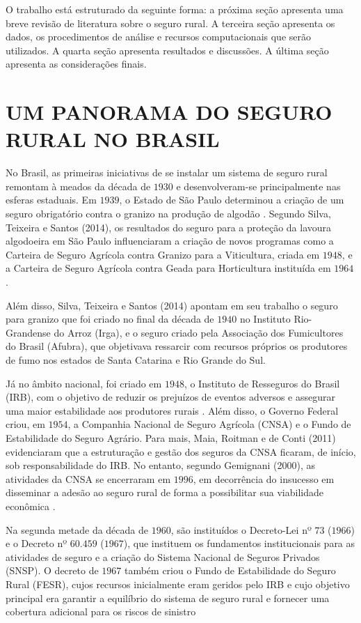O trabalho está estruturado da seguinte forma: a próxima seção apresenta uma breve revisão de literatura sobre o seguro rural. A terceira seção apresenta os dados, os procedimentos de análise e recursos computacionais que serão utilizados. A quarta seção apresenta resultados e discussões. A última seção apresenta as considerações finais.

\section{UM PANORAMA DO SEGURO RURAL NO BRASIL}

No Brasil, as primeiras iniciativas de se instalar um sistema de seguro rural remontam à meados da década de $1930$ e desenvolveram-se principalmente nas esferas estaduais. Em $1939$, o Estado de São Paulo determinou a criação de um seguro obrigatório contra o granizo na produção de algodão \cite{maia11}. Segundo Silva, Teixeira e Santos (2014), os resultados do seguro para a proteção da lavoura algodoeira em São Paulo influenciaram a criação de novos programas como a Carteira de Seguro Agrícola contra Granizo para a Viticultura, criada em $1948$, e a Carteira de Seguro Agrícola contra Geada para Horticultura instituída em $1964$.

Além disso, Silva, Teixeira e Santos (2014) apontam em seu trabalho o seguro para granizo que foi criado no final da década de $1940$ no Instituto Rio-Grandense do Arroz (Irga), e o seguro criado pela Associação dos Fumicultores do Brasil (Afubra), que objetivava ressarcir com recursos próprios os produtores de fumo nos estados de Santa Catarina e Rio Grande do Sul.

Já no âmbito nacional, foi criado em $1948$, o Instituto de  Resseguros do Brasil (IRB), com o objetivo de reduzir os prejuízos de eventos adversos e assegurar uma maior estabilidade aos produtores rurais \cite{silva14}. Além disso, o Governo Federal criou, em $1954$, a Companhia Nacional de Seguro Agrícola (CNSA) e o Fundo de Estabilidade do Seguro Agrário. Para mais, Maia,  Roitman e de Conti (2011) evidenciaram que a estruturação e gestão dos seguros da CNSA ficaram, de início, sob responsabilidade do IRB. No entanto, segundo Gemignani (2000), as atividades da CNSA se encerraram em $1996$, em decorrência do insucesso em disseminar a adesão ao seguro rural de forma a possibilitar sua viabilidade econômica \cite{maia11, silva14}.

Na segunda metade da década de $1960$, são instituídos o Decreto-Lei nº $73$ ($1966$) e o Decreto nº $60.459$ ($1967$), que instituem os fundamentos institucionais para as atividades de seguro e a criação do Sistema Nacional de Seguros Privados (SNSP). O decreto de $1967$ também criou o Fundo de Estabilidade do Seguro Rural (FESR), cujos recursos inicialmente eram geridos pelo IRB e cujo objetivo principal era garantir a equilíbrio do sistema de seguro rural e fornecer uma cobertura adicional para os riscos de sinistro \cite{silva14}

